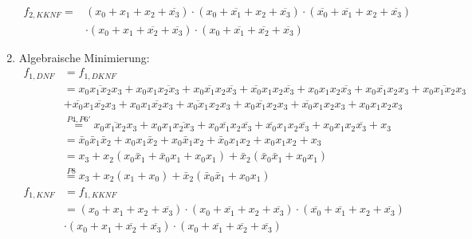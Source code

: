 \documentclass[a4paper]{article}
\begin{document}
\begin{enumerate}[label=\alph*)]
	\begin{equation*}
	\begin{aligned}
		f_{2, KKNF} = &(x_0 + x_1 + x_2 + \overline{x_3}) \cdot (x_0 + \overline{x_1} + x_2 + \overline{x_3}) \cdot (\overline{x_0} + \overline{x_1} + x_2 + \overline{x_3})\\ &\cdot (x_0 + x_1 + \overline{x_2} + \overline{x_3}) \cdot (x_0 + \overline{x_1} + \overline{x_2} + \overline{x_3})
	\end{aligned}
	\end{equation*}
	
	\clearpage
	\item Algebraische Minimierung:
	\begin{equation*}
            \begin{aligned}
                f_{1, DNF} &= f_{1, DKNF} \\
                           &= \overline{x_0 x_1 x_2 x_3} + x_0 x_1\overline{x_2 x_3} + x_0 \overline{x_1} x_2 \overline{x_3} + \overline{x_0} x_1 x_2 \overline{x_3} + x_0 x_1 x_2 \overline{x_3} + \overline{x_0 x_1 x_2} x_3 + x_0 \overline{x_1 x_2} x_3 \\
                           &+ \overline{x_0} x_1 \overline{x_2} x_3 + x_0 x_1 \overline{x_2} x_3 + \overline{x_0 x_1} x_2 x_3 + x_0 \overline{x_1} x_2 x_3 + \overline{x_0}x_1 x_2 x_3 + x_0 x_1 x_2 x_3 \\
                           &\stackrel{P4, P6'}{=} \overline{x_0 x_1 x_2 x_3} + x_0 x_1\overline{x_2 x_3} + x_0 \overline{x_1} x_2 \overline{x_3} + \overline{x_0} x_1 x_2 \overline{x_3} + x_0 x_1 x_2 \overline{x_3} +  x_3 \\
                           &\stackrel{}{=} \bar{x}_0 \bar{x}_1 \bar{x}_2 + x_0 x_1 \bar{x}_2 + x_0 \bar{x}_1 x_2 + \bar{x}_0 x_1 x_2 + x_0 x_1 x_2 +  x_3 \\
                           &\stackrel{}{=} x_3 + x_2 (x_0 \bar{x}_1 + \bar{x}_0 x_1 + x_0 x_1) + \bar{x}_2 (\bar{x}_0 \bar{x}_1 + x_0 x_1) \\
                           &\stackrel{P8}{=} x_3 + x_2 (x_1 + x_0) + \bar{x}_2 (\bar{x}_0 \bar{x}_1 + x_0 x_1)
            \end{aligned}
	\end{equation*}
	\begin{equation*}
            \begin{aligned}
                f_{1, KNF} &= f_{1, KKNF} \\
                           &= (x_0 + x_1 + x_2 + \overline{x_3}) \cdot (x_0 + \overline{x_1} + x_2 + \overline{x_3}) \cdot (\overline{x_0} + \overline{x_1} + x_2 + \overline{x_3})\\ &\cdot (x_0 + x_1 + \overline{x_2} + \overline{x_3}) \cdot (x_0 + \overline{x_1} + \overline{x_2} + \overline{x_3}) \\

\end{aligned}
\end{equation*}
\end{enumerate}
\end{document}

